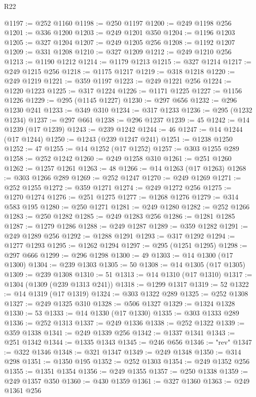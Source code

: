 \begin{lexlean}{R22}
\begin{coremodule}
@1197 := @252 @1160
@1198 := @250 @1197
@1200 := @249 @1198 @256
@1201 := @336 @1200
@1203 := @249 @1201 @350
@1204 := @1196 @1203
@1205 := @327 @1204
@1207 := @249 @1205 @256
@1208 := @1192 @1207
@1209 := @331 @1208
@1210 := @327 @1209
@1212 := @249 @1210 @256
@1213 := @1190 @1212
@1214 := @1179 @1213
@1215 := @327 @1214
@1217 := @249 @1215 @256
@1218 := @1175 @1217
@1219 := @318 @1218
@1220 := @249 @1219
@1221 := @359 @1197
@1223 := @249 @1221 @256
@1224 := @1220 @1223
@1225 := @317 @1224
@1226 := @1171 @1225
@1227 := @1156 @1226
@1229 := @295 (@1145 @1227)
@1230 := @297 @656
@1232 := @296 @1230 @241
@1233 := @349 @310
@1234 := @317 @1233
@1236 := @295 (@1232 @1234)
@1237 := @297 @661
@1238 := @296 @1237
@1239 := 45
@1242 := @14 @1239 (@17 @1239)
@1243 := @239 @1242
@1244 := 46
@1247 := @14 @1244 (@17 @1244)
@1250 := @1243 (@239 @1247 @241)
@1251 := @1238 @1250
@1252 := 47
@1255 := @14 @1252 (@17 @1252)
@1257 := @303 @1255 @289
@1258 := @252 @1242
@1260 := @249 @1258 @310
@1261 := @251 @1260
@1262 := @1257 @1261
@1263 := 48
@1266 := @14 @1263 (@17 @1263)
@1268 := @303 @1266 @289
@1269 := @252 @1247
@1270 := @249 @1269
@1271 := @252 @1255
@1272 := @359 @1271
@1274 := @249 @1272 @256
@1275 := @1270 @1274
@1276 := @251 @1275
@1277 := @1268 @1276
@1279 := @314 @583 @195
@1280 := @250 @1271
@1281 := @249 @1280
@1282 := @252 @1266
@1283 := @250 @1282
@1285 := @249 @1283 @256
@1286 := @1281 @1285
@1287 := @1279 @1286
@1288 := @249 @1287
@1289 := @359 @1282
@1291 := @249 @1289 @256
@1292 := @1288 @1291
@1293 := @317 @1292
@1294 := @1277 @1293
@1295 := @1262 @1294
@1297 := @295 (@1251 @1295)
@1298 := @297 @666
@1299 := @296 @1298
@1300 := 49
@1303 := @14 @1300 (@17 @1300)
@1304 := @239 @1303
@1305 := 50
@1308 := @14 @1305 (@17 @1305)
@1309 := @239 @1308
@1310 := 51
@1313 := @14 @1310 (@17 @1310)
@1317 := @1304 (@1309 (@239 @1313 @241))
@1318 := @1299 @1317
@1319 := 52
@1322 := @14 @1319 (@17 @1319)
@1324 := @303 @1322 @289
@1325 := @252 @1308
@1327 := @249 @1325 @310
@1328 := @506 @1327
@1329 := @1324 @1328
@1330 := 53
@1333 := @14 @1330 (@17 @1330)
@1335 := @303 @1333 @289
@1336 := @252 @1313
@1337 := @249 @1336
@1338 := @252 @1322
@1339 := @359 @1338
@1341 := @249 @1339 @256
@1342 := @1337 @1341
@1343 := @251 @1342
@1344 := @1335 @1343
@1345 := @246 @656
@1346 := "rev"
@1347 := @322 @1346
@1348 := @321 @1347
@1349 := @249 @1348
@1350 := @314 @298
@1351 := @1350 @195
@1352 := @252 @1303
@1354 := @249 @1352 @256
@1355 := @1351 @1354
@1356 := @249 @1355
@1357 := @250 @1338
@1359 := @249 @1357 @350
@1360 := @430 @1359
@1361 := @327 @1360
@1363 := @249 @1361 @256

\end{coremodule}
\end{lexlean}
